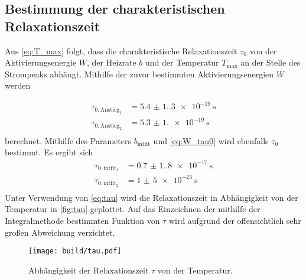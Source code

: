 \subsection{Bestimmung der charakteristischen Relaxationszeit}
\label{sec:Bestimmung_tau}
Aus \autoref{eq:T_max} folgt, dass die charakteristische Relaxationszeit $\tau_0$ von der Aktivierungsenergie $W$, der Heizrate $b$ und der Temperatur $T_{\text{max}}$ an der 
Stelle des Strompeaks abhängt. Mithilfe der zuvor bestimmten Aktivierungsenergien $W$ werden 

\begin{align*}
    \tau_{0, \text{Anstieg}_1} &= \qty{5.4(1.3)e-19}{\second} \\
    \tau_{0, \text{Anstieg}_2} &= \qty{5.3(1.0)e-19}{\second} \\
\end{align*}
berechnet. 
Mithilfe des Parameters $b_{\text{intfit}}$ und \autoref{eq:W_tau0} wird ebenfalls $\tau_0$ bestimmt. Es ergibt sich
\begin{align*}
    \tau_{0, \text{intfit}_1} &= \qty{0.7(1.8)e-17}{\second} \\
    \tau_{0, \text{intfit}_2} &= \qty{1(5)e-23}{\second} \\
\end{align*}
Unter Verwendung von \autoref{eq:tau} wird die Relaxationszeit in Abhängigkeit von der Temperatur in \autoref{fig:tau} geplottet. Auf das Einzeichnen der mithilfe der
Integralmethode bestimmten Funktion von $\tau$ wird aufgrund der offensichtlich sehr großen Abweichung verzichtet.

\begin{figure}
    \centering
    \texttt{[image: build/tau.pdf]}
    \caption{Abhängigkeit der Relaxationszeit $\tau$ von der Temperatur.}
    \label{fig:tau}
\end{figure}












































































